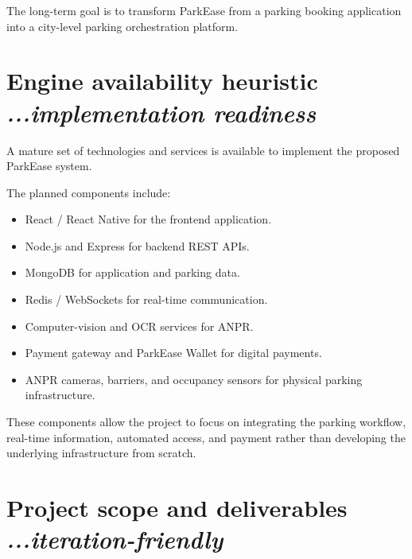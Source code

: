 \documentclass[12pt,a4paper]{article}
\begin{document}
The long-term goal is to transform ParkEase from a parking booking application into a city-level parking orchestration platform.


\section{\textbf{Engine availability heuristic}
\hfill
{\small\mdseries\itshape ...implementation readiness}}

A mature set of technologies and services is available to implement the proposed ParkEase system.

The planned components include:

\begin{itemize}
    \item React / React Native for the frontend application.

    \item Node.js and Express for backend REST APIs.

    \item MongoDB for application and parking data.

    \item Redis / WebSockets for real-time communication.

    \item Computer-vision and OCR services for ANPR.

    \item Payment gateway and ParkEase Wallet for digital payments.

    \item ANPR cameras, barriers, and occupancy sensors for physical parking infrastructure.
\end{itemize}

These components allow the project to focus on integrating the parking workflow, real-time information, automated access, and payment rather than developing the underlying infrastructure from scratch.


\section{\textbf{Project scope and deliverables}
\hfill
{\small\mdseries\itshape ...iteration-friendly}}
\end{document}
